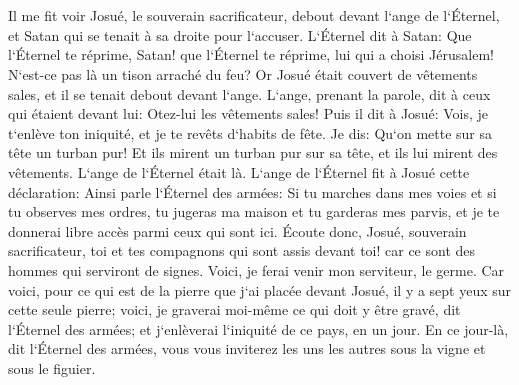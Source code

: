 \chapter{}

\verse Il me fit voir Josué, le souverain sacrificateur, debout devant l`ange de l`Éternel, et Satan qui se tenait à sa droite pour l`accuser. 
\verse L`Éternel dit à Satan: Que l`Éternel te réprime, Satan! que l`Éternel te réprime, lui qui a choisi Jérusalem! N`est-ce pas là un tison arraché du feu? 
\verse Or Josué était couvert de vêtements sales, et il se tenait debout devant l`ange. 
\verse L`ange, prenant la parole, dit à ceux qui étaient devant lui: Otez-lui les vêtements sales! Puis il dit à Josué: Vois, je t`enlève ton iniquité, et je te revêts d`habits de fête. 
\verse Je dis: Qu`on mette sur sa tête un turban pur! Et ils mirent un turban pur sur sa tête, et ils lui mirent des vêtements. L`ange de l`Éternel était là. 
\verse L`ange de l`Éternel fit à Josué cette déclaration: 
\verse Ainsi parle l`Éternel des armées: Si tu marches dans mes voies et si tu observes mes ordres, tu jugeras ma maison et tu garderas mes parvis, et je te donnerai libre accès parmi ceux qui sont ici. 
\verse Écoute donc, Josué, souverain sacrificateur, toi et tes compagnons qui sont assis devant toi! car ce sont des hommes qui serviront de signes. Voici, je ferai venir mon serviteur, le germe. 
\verse Car voici, pour ce qui est de la pierre que j`ai placée devant Josué, il y a sept yeux sur cette seule pierre; voici, je graverai moi-même ce qui doit y être gravé, dit l`Éternel des armées; et j`enlèverai l`iniquité de ce pays, en un jour. 
\verse En ce jour-là, dit l`Éternel des armées, vous vous inviterez les uns les autres sous la vigne et sous le figuier. 

\chapter{}

